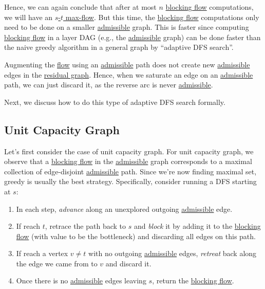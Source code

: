 Hence, we can again conclude that after at most \(n\) \hyperref[def:blocking-flow]{blocking flow} computations, we will have an \hyperref[prb:s-t-max-flow]{\(s\)-\(t\) max-flow}. But this time, the \hyperref[def:blocking-flow]{blocking flow} computations only need to be done on a smaller \hyperref[def:admissible]{admissible} graph. This is faster since computing \hyperref[def:blocking-flow]{blocking flow} in a layer DAG (e.g., the \hyperref[def:admissible]{admissible} graph) can be done faster than the naive greedy algorithm in a general graph by ``adaptive DFS search''.

\begin{intuition}
	Augmenting the \hyperref[def:flow]{flow} using an \hyperref[def:admissible]{admissible} path does not create new \hyperref[def:admissible]{admissible} edges in the \hyperref[def:residual-graph]{residual graph}. Hence, when we saturate an edge on an \hyperref[def:admissible]{admissible} path, we can just discard it, as the reverse arc is never \hyperref[def:admissible]{admissible}.
\end{intuition}

Next, we discuss how to do this type of adaptive DFS search formally.

\subsection{Unit Capacity Graph}
Let's first consider the case of unit capacity graph. For unit capacity graph, we observe that a \hyperref[def:blocking-flow]{blocking flow} in the \hyperref[def:admissible]{admissible} graph corresponds to a maximal collection of edge-disjoint \hyperref[def:admissible]{admissible} path. Since we're now finding maximal set, greedy is usually the best strategy. Specifically, consider running a DFS starting at \(s\):
\begin{enumerate}
	\item\label{algo:adaptive-DFS-advance} In each step, \emph{advance} along an unexplored outgoing \hyperref[def:admissible]{admissible} edge.
	\item\label{algo:adaptive-DFS-block} If reach \(t\), retrace the path back to \(s\) and \emph{block} it by adding it to the \hyperref[def:blocking-flow]{blocking flow} (with value to be the bottleneck) and discarding all edges on this path.
	\item\label{algo:adaptive-DFS-retreat} If reach a vertex \(v \neq t\) with no outgoing \hyperref[def:admissible]{admissible} edges, \emph{retreat} back along the edge we came from to \(v\) and discard it.
	\item Once there is no \hyperref[def:admissible]{admissible} edges leaving \(s\), return the \hyperref[def:blocking-flow]{blocking flow}.
\end{enumerate}

